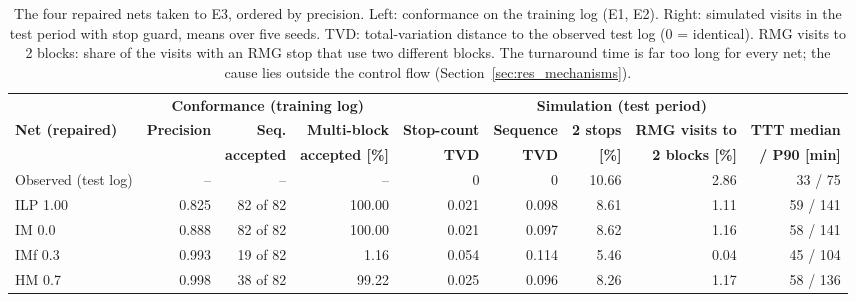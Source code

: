 \begin{table}[htbp]
\centering
\footnotesize
\setlength{\tabcolsep}{3pt}
\begin{tabular}{lrrr|rrrrr}
\toprule
 & \multicolumn{3}{c|}{\textbf{Conformance (training log)}} & \multicolumn{5}{c}{\textbf{Simulation (test period)}} \\
\textbf{Net (repaired)} & \textbf{Precision} & \textbf{Seq.} & \textbf{Multi-block} & \textbf{Stop-count} & \textbf{Sequence} & \textbf{2 stops} & \textbf{RMG visits to} & \textbf{TTT median} \\
 & & \textbf{accepted} & \textbf{accepted [\%]} & \textbf{TVD} & \textbf{TVD} & \textbf{[\%]} & \textbf{2 blocks [\%]} & \textbf{/ P90 [min]} \\
\midrule
Observed (test log) & -- & -- & -- & 0 & 0 & 10.66 & 2.86 & 33 / 75 \\
\midrule
ILP 1.00 & 0.825 & 82 of 82 & 100.00 & 0.021 & 0.098 & 8.61 & 1.11 & 59 / 141 \\
IM 0.0 & 0.888 & 82 of 82 & 100.00 & 0.021 & 0.097 & 8.62 & 1.16 & 58 / 141 \\
IMf 0.3 & 0.993 & 19 of 82 & 1.16 & 0.054 & 0.114 & 5.46 & 0.04 & 45 / 104 \\
HM 0.7 & 0.998 & 38 of 82 & 99.22 & 0.025 & 0.096 & 8.26 & 1.17 & 58 / 136 \\
\bottomrule
\end{tabular}
\caption{The four repaired nets taken to E3, ordered by precision. Left: conformance on the training log (E1, E2). Right: simulated visits in the test period with stop guard, means over five seeds. TVD: total-variation distance to the observed test log (0 = identical). RMG visits to 2 blocks: share of the visits with an RMG stop that use two different blocks. The turnaround time is far too long for every net; the cause lies outside the control flow (Section~\ref{sec:res_mechanisms}).}
\label{tab:rq1_e3_candidates}
\end{table}
